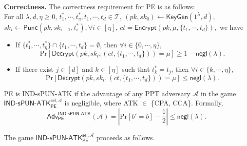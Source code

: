 \documentclass[runningheads,10pt]{llncs}
\def\Pr{\mathrm{Pr}}
\begin{document}
\noindent \textbf{Correctness.} The correctness requirement for PE is as follows: \\
For all $\lambda, d, \eta\geq 0$, $t^*_1, \cdots, t^*_\eta ,t_1, \cdots, t_d \in \mathcal{T}$,   $(pk, sk_0) \leftarrow \textsf{KeyGen}(1^\lambda, d)$, $sk_i\gets\textsf{Punc}(pk, sk_{i-1},t^*_i), \forall i \in  [\eta]$, $ct=\textsf{Encrypt}(pk,\mu, \{t_1, \cdots, t_d\}),$ we have 
\begin{itemize}
\item If $\{t^*_1, \cdots, t^*_\eta\}\cap \{t_1, \cdots, t_d\}=\emptyset $, then  $\forall i\in \{0,\cdots, \eta\}$,
\[
\Pr[\textsf{Decrypt}(pk, sk_i, (ct, \{t_1, \cdots, t_d\}))=\mu]\geq 1-\textsf{negl}(\lambda).
\] 
\item If there exist $j\in[d]$ and $k\in [\eta]$ such that $t^*_k=  t_j$,  then $\forall i \in \{k,\cdots, \eta\}$,
\[
\Pr[\textsf{Decrypt}(pk, sk_i, (ct, \{t_1, \cdots, t_d\}))=\mu]\leq \textsf{negl}(\lambda).
\] 
\end{itemize}

\begin{definition}
	PE is IND-sPUN-ATK if the advantage of any PPT adversary $\mathcal{A}$ in 
	the game $\mathsf{IND}$-$\mathsf{sPUN}$-$\mathsf{ATK}^{\mathsf{sel},\mathcal{A}}_{\mathsf{PE}}$ is negligible,
	where ATK $\in $ \{CPA, CCA\}. 
	Formally,
	$$\mathsf{Adv}_{\mathsf{PE}}^{\mathsf{IND}\text{-}\mathsf{sPUN}\text{-}\mathsf{ATK}}(\mathcal{A})=|\Pr[b'=b]-\frac{1}{2}| \leq \mathsf{negl}(\lambda).$$
\end{definition}
The game $\mathsf{IND}$-$\mathsf{sPUN}$-$\mathsf{ATK}^{\mathsf{sel},\mathcal{A}}_{\mathsf{PE}}$ proceeds as follows.
\end{document}
